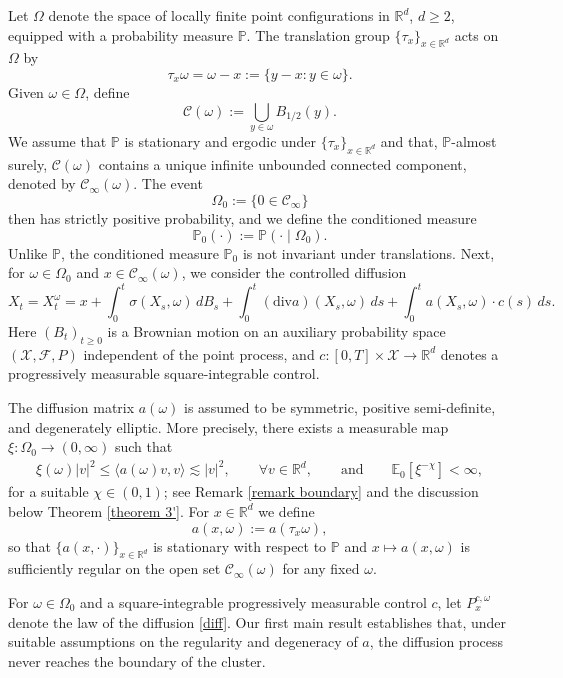 \documentclass[11pt]{article}
\newcommand{\R}{\mathbb R}
\newcommand{\E}{\mathbb E}
\renewcommand{\P}{\mathbb P}
\theoremstyle{rem}
\begin{document}
Let $\Omega$ denote the space of locally finite point configurations in $\R^d$, $d\ge2$, equipped with a probability measure $\P$. The translation group $\{\tau_x\}_{x\in\R^d}$ acts on $\Omega$ by
\[
\tau_x\omega=\omega-x:=\{y-x:y\in\omega\}.
\]
Given $\omega\in\Omega$, define
\[
\mathcal C(\omega):=\bigcup_{y\in\omega} B_{1/2}(y).
\]
We assume that $\P$ is stationary and ergodic under $\{\tau_x\}_{x\in\R^d}$ and that, $\P$-almost surely, $\mathcal C(\omega)$ contains a unique infinite unbounded connected component, denoted by $\mathcal C_\infty(\omega)$. The event
\[
\Omega_0:=\{0\in\mathcal C_\infty\}
\]
then has strictly positive probability, and we define the conditioned measure
\[
\P_0(\cdot):=\P(\cdot\mid \Omega_0).
\]
Unlike $\P$, the conditioned measure $\P_0$ is not invariant under translations. Next, for 
$\omega\in\Omega_0$ and $x\in\mathcal C_\infty(\omega)$, we consider the controlled diffusion
\begin{equation}\label{diff}
X_t=X_t^\omega
= x + \int_0^t \sigma(X_s,\omega)\,dB_s
+ \int_0^t (\mathrm{div}a)(X_s,\omega)\,ds
+ \int_0^t a(X_s,\omega)\cdot c(s)\,ds .
\end{equation}
Here $(B_t)_{t\ge0}$ is a Brownian motion on an auxiliary probability space $(\mathscr X, 
\mathcal F,P)$ independent of the point process, and $c:[0,T]\times\mathscr X\to\R^d$ denotes 
a progressively measurable square-integrable control.

The diffusion matrix $a(\omega)$ is assumed to be symmetric, positive semi-definite, and 
degenerately elliptic. More precisely, there exists a measurable map $\xi:\Omega_0\to(0,\infty)$ 
such that
\begin{equation}\label{a deg}
\begin{aligned}
\xi(\omega)|v|^2
\le \langle a(\omega)v,v\rangle
\lesssim |v|^2,
\qquad \forall v\in\R^d, \qquad\mbox{and}\qquad
\E_0[\xi^{-\chi}]<\infty,
\end{aligned}
\end{equation}
for a suitable $\chi\in(0,1)$; see Remark \ref{remark boundary} and the discussion below Theorem \ref{theorem 3'}. For $x\in\R^d$ we define
\[
a(x,\omega):=a(\tau_x\omega),
\]
so that $\{a(x,\cdot)\}_{x\in\R^d}$ is stationary with respect to $\P$ and $x\mapsto a(x,\omega)$ 
is sufficiently regular on the open set $ \mathcal C_\infty(\omega)$ for any fixed $\omega$. 

For $\omega\in\Omega_0$ and a square-integrable progressively measurable control $c$, let 
$P_x^{c,\omega}$ denote the law of the diffusion \eqref{diff}. Our first main result establishes 
that, under suitable assumptions on the regularity and degeneracy of $a$, the diffusion process 
never reaches the boundary of the cluster.
\end{document}
